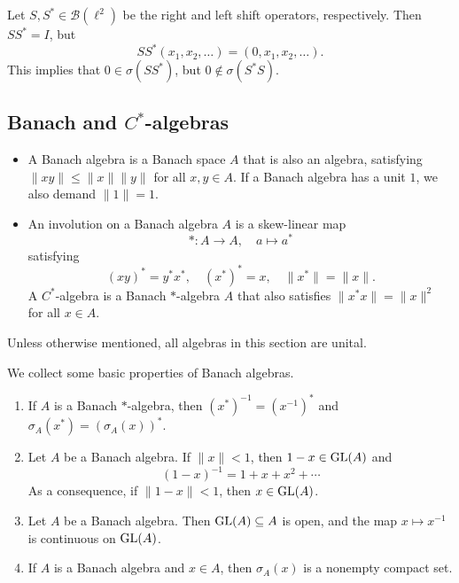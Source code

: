 \begin{example}
  Let $S, S^* \in \mathcal{B}(\ell^2)$ be the right and left shift operators, respectively.
  Then $S S^* = I$, but $$S S^* (x_1, x_2, \dots) = (0, x_1, x_2, \dots).$$
  This implies that $0 \in \sigma (S S^*)$, but $0 \notin \sigma (S^* S)$.
\end{example}

\subsection{Banach and $C^*$-algebras}

\begin{definition}
  \begin{itemize}
    \item A Banach algebra is a Banach space $A$ that is also an algebra, satisfying $\|xy\| \leq \|x\| \|y\|$ for all $x, y \in A$.
    If a Banach algebra has a unit $1$, we also demand $\|1\| = 1$.
    \item An involution on a Banach algebra $A$ is a skew-linear map $$*: A \to A,\quad a \mapsto a^*$$
    satisfying $$(xy)^* = y^* x^*,\quad (x^*)^* = x,\quad \|x^*\| = \|x\|.$$
    A $C^*$-algebra is a Banach $*$-algebra $A$ that also satisfies $\|x^* x\| = \|x\|^2$ for all $x \in A$.
  \end{itemize}
\end{definition}

Unless otherwise mentioned, all algebras in this section are unital.
\begin{proposition}
  We collect some basic properties of Banach algebras.
  \begin{enumerate}
    \item If $A$ is a Banach $*$-algebra, then 
    $(x^*)^{-1} = (x^{-1})^*$ and $\sigma_A (x^*) = (\sigma_A (x))^*.$
    \item Let $A$ be a Banach algebra. If $\|x\| < 1$, then $1 - x \in \operatorname{GL} (A)$ and 
    $$(1 - x)^{-1} = 1 + x + x^2 + \cdots$$ As a consequence, if $\| 1 - x\| < 1$, then $x \in \operatorname{GL} (A)$.
    \item Let $A$ be a Banach algebra. Then $\operatorname{GL}(A) \subseteq A$ is open, and the map $x \mapsto x^{-1}$ is continuous on $\operatorname{GL} (A)$.
    \item If $A$ is a Banach algebra and $x \in A$, then $\sigma_A (x)$ is a nonempty compact set.
  \end{enumerate}
\end{proposition}


